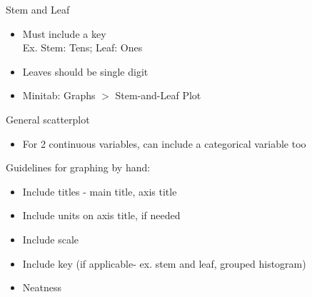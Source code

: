 \documentclass[12pt]{article}
\begin{document}
\noindent Stem and Leaf
\vspace{-\baselineskip}
\begin{itemize} [noitemsep, nolistsep, topsep = 0pt]
\item Must include a key \\Ex. Stem: Tens; Leaf: Ones
\item Leaves should be single digit
\item Minitab: Graphs $>$ Stem-and-Leaf Plot
\end{itemize}


\noindent General scatterplot
\vspace{-\baselineskip}
\begin{itemize}[noitemsep, nolistsep, topsep = 0pt]
\item For 2 continuous variables, can include a categorical variable too
\end{itemize}


\noindent Guidelines for graphing by hand: 
\begin{itemize} [noitemsep, nolistsep, topsep = 0pt]
\vspace{-\baselineskip}
\item Include titles - main title, axis title 
\item Include units on axis title, if needed
\item Include scale 
\item Include key (if applicable- ex. stem and leaf, grouped
histogram)
\item Neatness
\end{itemize}
\end{document}
